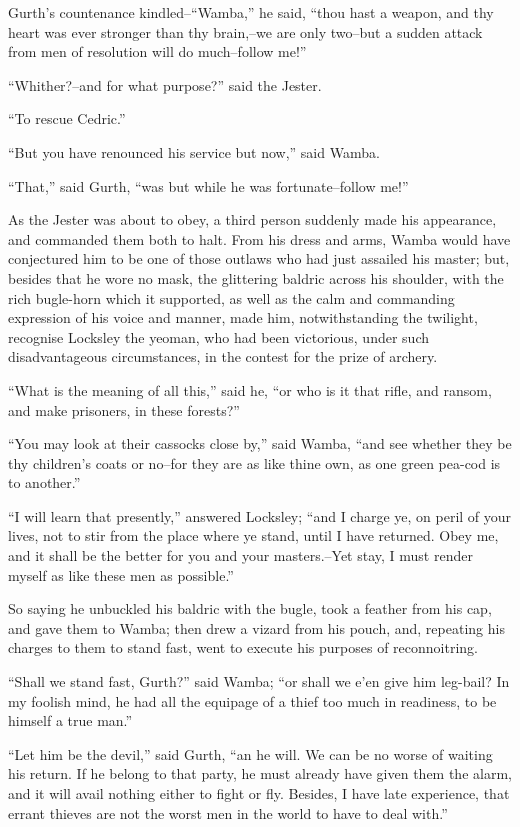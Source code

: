 Gurth's countenance kindled--``Wamba,'' he said, ``thou hast a weapon,
and thy heart was ever stronger than thy brain,--we are only two--but a
sudden attack from men of resolution will do much--follow me!''

``Whither?--and for what purpose?'' said the Jester.

``To rescue Cedric.''

``But you have renounced his service but now,'' said Wamba.

``That,'' said Gurth, ``was but while he was fortunate--follow me!''

As the Jester was about to obey, a third person suddenly made his
appearance, and commanded them both to halt. From his dress and arms,
Wamba would have conjectured him to be one of those outlaws who had just
assailed his master; but, besides that he wore no mask, the glittering
baldric across his shoulder, with the rich bugle-horn which it
supported, as well as the calm and commanding expression of his voice
and manner, made him, notwithstanding the twilight, recognise Locksley
the yeoman, who had been victorious, under such disadvantageous
circumstances, in the contest for the prize of archery.

``What is the meaning of all this,'' said he, ``or who is it that rifle,
and ransom, and make prisoners, in these forests?''

``You may look at their cassocks close by,'' said Wamba, ``and see
whether they be thy children's coats or no--for they are as like thine
own, as one green pea-cod is to another.''

``I will learn that presently,'' answered Locksley; ``and I charge ye,
on peril of your lives, not to stir from the place where ye stand, until
I have returned. Obey me, and it shall be the better for you and your
masters.--Yet stay, I must render myself as like these men as
possible.''

So saying he unbuckled his baldric with the bugle, took a feather from
his cap, and gave them to Wamba; then drew a vizard from his pouch, and,
repeating his charges to them to stand fast, went to execute his
purposes of reconnoitring.

``Shall we stand fast, Gurth?'' said Wamba; ``or shall we e'en give him
leg-bail? In my foolish mind, he had all the equipage of a thief too
much in readiness, to be himself a true man.''

``Let him be the devil,'' said Gurth, ``an he will. We can be no worse
of waiting his return. If he belong to that party, he must already have
given them the alarm, and it will avail nothing either to fight or fly.
Besides, I have late experience, that errant thieves are not the worst
men in the world to have to deal with.''

